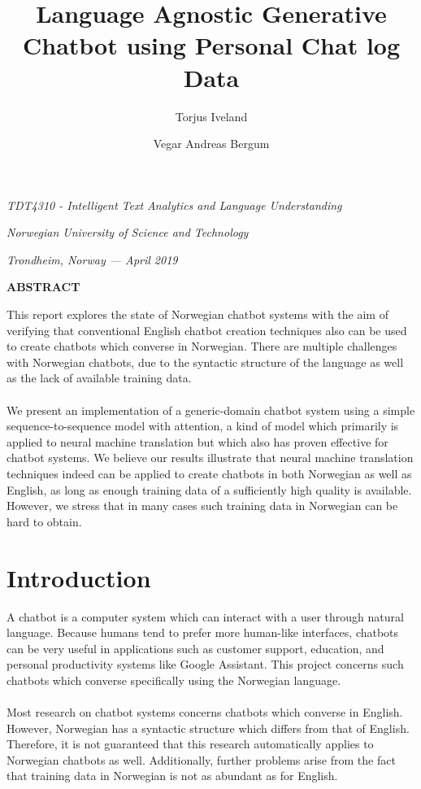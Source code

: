 \documentclass{article}
\title{\textbf{Language Agnostic Generative Chatbot using Personal Chat log
Data}}
\author{Torjus Iveland \and Vegar Andreas Bergum}
\date{}
\renewcommand\abstractname{ABSTRACT}
\renewenvironment{abstract}
 {\small
  \begin{center}
  \bfseries \abstractname\vspace{0em}
  \end{center}
  \list{}{
    \setlength{\leftmargin}{12.5mm}%
    \setlength{\rightmargin}{\leftmargin}%
  }
  \item\relax}
 {\endlist}
\begin{document}
\maketitle
\centerline{\textit{TDT4310 - Intelligent Text Analytics and Language
Understanding}}
\centerline{\textit{Norwegian University of Science and Technology}}
\centerline{\textit{Trondheim, Norway --- April 2019}}
\vspace{6mm} %

\begin{abstract}

This report explores the state of Norwegian chatbot systems with
the aim of verifying that conventional English chatbot creation techniques
also can be used to create chatbots which converse in Norwegian. There are
multiple challenges with Norwegian chatbots, due to the syntactic structure
of the language as well as the lack of available training data.

\paragraph{}
We present an implementation of a generic-domain chatbot system using a simple
sequence-to-sequence model with attention, a kind of model which primarily is
applied to neural machine translation but which also has proven effective for
chatbot systems. We believe our results illustrate that neural machine
translation techniques indeed can be applied to create chatbots in both
Norwegian as well as English, as long as enough training data of a
sufficiently high quality is available. However, we stress that in many cases
such training data in Norwegian can be hard to obtain.  

\end{abstract}

\vspace{3mm}

\section*{Introduction}
A chatbot is a computer system which can interact with a user through natural
language. Because humans tend to prefer more human-like interfaces, chatbots
can be very useful in applications such as customer support, education, and
personal productivity systems like Google Assistant. This project concerns
such chatbots which converse specifically using the Norwegian language.

\paragraph{}
Most research on chatbot systems concerns chatbots which converse in English.
However, Norwegian has a syntactic structure which differs from that of
English. Therefore, it is not guaranteed that this research automatically
applies to Norwegian chatbots as well. Additionally, further problems arise
from the fact that training data in Norwegian is not as abundant as for
English.
\end{document}
